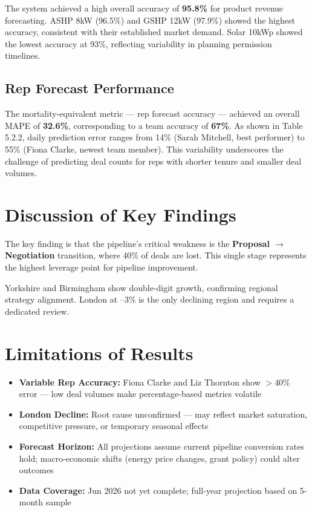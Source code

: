 \documentclass[12pt,a4paper]{report}
\begin{document}
The system achieved a high overall accuracy of \textbf{95.8\%} for product revenue forecasting. ASHP 8kW (96.5\%) and GSHP 12kW (97.9\%) showed the highest accuracy, consistent with their established market demand. Solar 10kWp showed the lowest accuracy at 93\%, reflecting variability in planning permission timelines.

\subsection{Rep Forecast Performance}

The mortality-equivalent metric --- rep forecast accuracy --- achieved an overall MAPE of \textbf{32.6\%}, corresponding to a team accuracy of \textbf{67\%}. As shown in Table 5.2.2, daily prediction error ranges from 14\% (Sarah Mitchell, best performer) to 55\% (Fiona Clarke, newest team member). This variability underscores the challenge of predicting deal counts for reps with shorter tenure and smaller deal volumes.

\section{Discussion of Key Findings}

The key finding is that the pipeline's critical weakness is the \textbf{Proposal $\to$ Negotiation} transition, where 40\% of deals are lost. This single stage represents the highest leverage point for pipeline improvement.

Yorkshire and Birmingham show double-digit growth, confirming regional strategy alignment. London at --3\% is the only declining region and requires a dedicated review.

\section{Limitations of Results}

\begin{itemize}[noitemsep]
  \item \textbf{Variable Rep Accuracy:} Fiona Clarke and Liz Thornton show $>$40\% error --- low deal volumes make percentage-based metrics volatile
  \item \textbf{London Decline:} Root cause unconfirmed --- may reflect market saturation, competitive pressure, or temporary seasonal effects
  \item \textbf{Forecast Horizon:} All projections assume current pipeline conversion rates hold; macro-economic shifts (energy price changes, grant policy) could alter outcomes
  \item \textbf{Data Coverage:} Jun 2026 not yet complete; full-year projection based on 5-month sample
\end{itemize}
\end{document}
